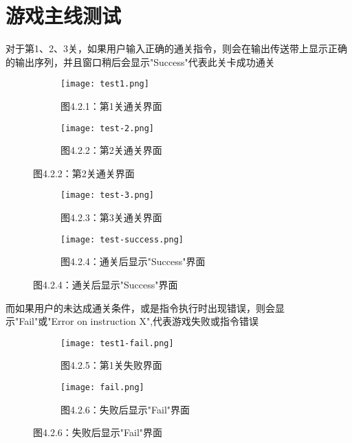 \documentclass{report}
\begin{document}
    \section{游戏主线测试}
    对于第1、2、3关，如果用户输入正确的通关指令，则会在输出传送带上显示正确的输出序列，并且窗口稍后会显示"Success"代表此关卡成功通关
    \begin{figure}[htbp]
        \centering
        \begin{subfigure}[b]{0.45\textwidth}
            \texttt{[image: test1.png]}
            \caption*{图4.2.1：第1关通关界面}
        \end{subfigure}
        \hfill
        \begin{subfigure}[b]{0.45\textwidth}
            \texttt{[image: test-2.png]}
            \caption*{图4.2.2：第2关通关界面}
        \end{subfigure}
    \end{figure}
    \begin{figure}[htbp]
        \centering
        \begin{subfigure}[b]{0.45\textwidth}
            \texttt{[image: test-3.png]}
            \caption*{图4.2.3：第3关通关界面}
        \end{subfigure}
        \hfill
        \begin{subfigure}[b]{0.45\textwidth}
            \texttt{[image: test-success.png]}
            \caption*{图4.2.4：通关后显示"Success"界面}
        \end{subfigure}
    \end{figure}\vspace{1em}\par
    而如果用户的未达成通关条件，或是指令执行时出现错误，则会显示"Fail"或"Error on instruction X",代表游戏失败或指令错误\newpage
    \begin{figure}[t]
        \begin{subfigure}[b]{0.45\textwidth}
            \texttt{[image: test1-fail.png]}
            \caption*{图4.2.5：第1关失败界面}
        \end{subfigure}
        \hfill
        \begin{subfigure}[b]{0.45\textwidth}
            \texttt{[image: fail.png]}
            \caption*{图4.2.6：失败后显示"Fail"界面}
        \end{subfigure}
    \end{figure}\par
\end{document}
